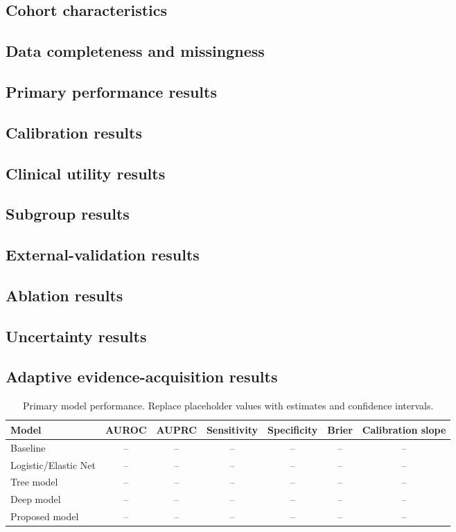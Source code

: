 \documentclass[10pt,journal]{IEEEtran}
\begin{document}
\subsection{Cohort characteristics}
\subsection{Data completeness and missingness}
\subsection{Primary performance results}
\subsection{Calibration results}
\subsection{Clinical utility results}
\subsection{Subgroup results}
\subsection{External-validation results}
\subsection{Ablation results}
\subsection{Uncertainty results}
\subsection{Adaptive evidence-acquisition results}

\begin{table}[t]
\centering
\caption{Primary model performance. Replace placeholder values with estimates and confidence intervals.}
\label{tab:main-results}
\begin{tabular}{lcccccc}
\toprule
Model & AUROC & AUPRC & Sensitivity & Specificity & Brier & Calibration slope \\
\midrule
Baseline & -- & -- & -- & -- & -- & -- \\
Logistic/Elastic Net & -- & -- & -- & -- & -- & -- \\
Tree model & -- & -- & -- & -- & -- & -- \\
Deep model & -- & -- & -- & -- & -- & -- \\
Proposed model & -- & -- & -- & -- & -- & -- \\
\bottomrule
\end{tabular}
\end{table}
\end{document}
